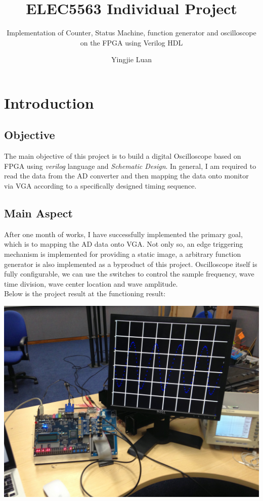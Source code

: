 \documentclass[11pt]{scrartcl}
\begin{document}
\title{ELEC5563 Individual Project}
\subtitle{ Implementation of Counter, Status Machine, function generator and oscilloscope on the FPGA using Verilog HDL}
\author{Yingjie Luan}
\maketitle

\tableofcontents

\section{Introduction}
\subsection{Objective}
The main objective of this project is to build a digital Oscilloscope based on FPGA using \textit{verilog} language and \textit{Schematic Design}. In general, I am required to read the data from the AD converter and then mapping the data onto monitor via VGA according to a specifically designed timing sequence.
\subsection{Main Aspect}
After one month of works, I have successfully implemented the primary goal, which is to mapping the AD data onto VGA. Not only so, an edge triggering mechanism is implemented for providing a static image, a arbitrary function generator is also implemented as a byproduct of this project. Oscilloscope itself is fully configurable, we can use the switches to control the sample frequency, wave time division, wave center location and wave amplitude. \\

Below is the project result at the functioning result:

\begin{center}
\begin{minipage}[t]{\linewidth}

{
\includegraphics[scale = 0.15]{IMG_1388.JPG}
}
\end{minipage}
\medskip
\end{center}
\end{document}
